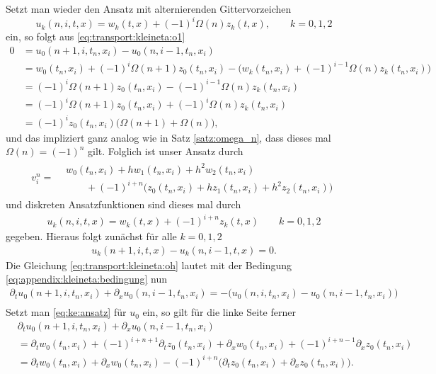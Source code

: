 Setzt man wieder den Ansatz mit alternierenden Gittervorzeichen
\[ u_k(n, i, t, x) = w_k(t, x) + (-1)^i \Omega(n) z_k(t, x), \qquad k = 0,1,2 \]
ein, so folgt aus \eqref{eq:transport:kleineta:o1}
\begin{align*}
0 &= u_0(n+1, i, t_n, x_i) - u_0(n, i-1, t_n, x_i)\\
&= w_0(t_n, x_i) + (-1)^i \Omega(n+1) z_0(t_n, x_i) - \bigl( w_k(t_n, x_i) + (-1)^{i-1} \Omega(n) z_k(t_n, x_i) \bigr)\\
&= (-1)^i \Omega(n+1) z_0(t_n, x_i) - (-1)^{i-1} \Omega(n) z_k(t_n, x_i)\\
&= (-1)^i \Omega(n+1) z_0(t_n, x_i) + (-1)^{i} \Omega(n) z_k(t_n, x_i)\\
&= (-1)^i z_0(t_n, x_i) \bigl( \Omega(n+1) + \Omega(n) \bigr),
\end{align*}
und das impliziert ganz analog wie in Satz \ref{satz:omega_n}, dass dieses mal $\Omega(n) = (-1)^n$ gilt.
Folglich ist unser Ansatz durch
\begin{align}
v^n_i = \begin{split}
&w_0(t_n, x_i) + h w_1(t_n, x_i) + h^2 w_2(t_n, x_i)\\
&\qquad + (-1)^{i+n} \bigl( z_0(t_n, x_i) + h z_1(t_n, x_i) + h^2 z_2(t_n, x_i) \bigr)
\end{split}
\end{align}
und diskreten Ansatzfunktionen sind dieses mal durch
\begin{align}\label{eq:ke:ansatz} u_k(n, i, t, x) = w_k(t,x) + (-1)^{i+n} z_k(t, x) \qquad k = 0,1,2 \end{align}
gegeben. Hieraus folgt zunächst für alle $k = 0,1,2$
\begin{align}\label{eq:appendix:kleineta:bedingung}
u_k(n+1, i, t, x) - u_k(n, i-1, t, x) = 0.
\end{align}
Die Gleichung \eqref{eq:transport:kleineta:oh} lautet mit der Bedingung \eqref{eq:appendix:kleineta:bedingung} nun
\begin{align*}
\partial_t u_0(n+1, i, t_n, x_i) + \partial_x u_0(n, i-1, t_n, x_i) = - \bigl( u_0(n, i, t_n, x_i) - u_0(n, i-1, t_n, x_i) \bigr)\\
\end{align*}
Setzt man \eqref{eq:ke:ansatz} für $u_0$ ein, so gilt für die linke Seite ferner
\begin{align}\label{eq:appendix:kleineta:oh:linkeseite}
&\partial_t u_0(n+1, i, t_n, x_i) + \partial_x u_0(n, i-1, t_n, x_i) \nonumber\\
&= \partial_t w_0(t_n,x_i) + (-1)^{i+n+1} \partial_t z_0(t_n,x_i)+ \partial_x w_0(t_n,x_i) + (-1)^{i+n-1} \partial_x z_0(t_n,x_i)\nonumber\\
&= \partial_t w_0(t_n,x_i) + \partial_x w_0(t_n,x_i) - (-1)^{i+n} \bigl( \partial_t z_0(t_n,x_i) + \partial_x z_0(t_n,x_i) \bigr).
\end{align}
